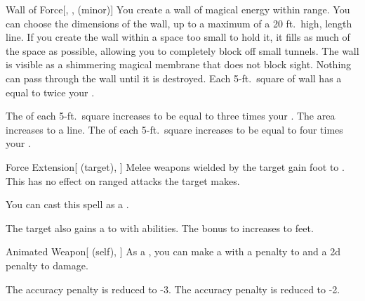 \lowercase{\hypertarget{spell:Wall of Force}{}}\label{spell:Wall of Force}
\begin{freeability}[Rank 1]{\hypertarget{spell:Wall of Force}{Wall of Force}}[, ,  (minor)]
\targetrule
You create a wall of magical energy within \rngmed range.
You can choose the dimensions of the wall, up to a maximum of a 20 ft.\ high, \areamed length line.
If you create the wall within a space too small to hold it, it fills as much of the space as possible, allowing you to completely block off small tunnels.
The wall is visible as a shimmering magical membrane that does not block sight.
Nothing can pass through the wall until it is destroyed.
Each 5-ft.\ square of wall has a  equal to twice your .

\rankline
{} The  of each 5-ft.\ square increases to be equal to three times your .
 The area increases to a \arealarge line.
 The  of each 5-ft.\ square increases to be equal to four times your .
\end{freeability}
\vspace{0.25em}



\lowercase{\hypertarget{spell:Force Extension}{}}\label{spell:Force Extension}
\begin{attuneability}[Rank 3]{\hypertarget{spell:Force Extension}{Force Extension}}[ (target), ]
Melee weapons wielded by the target gain  foot  to .
This has no effect on ranged attacks the target makes.

You can cast this spell as a .

\rankline
{} The target also gains a   to  with  abilities.
 The bonus to  increases to  feet.
\end{attuneability}
\vspace{0.25em}



\lowercase{\hypertarget{spell:Animated Weapon}{}}\label{spell:Animated Weapon}
\begin{attuneability}[Rank 4]{\hypertarget{spell:Animated Weapon}{Animated Weapon}}[ (self), ]
As a , you can make a  with a  penalty to  and a \minus2d penalty to damage.

\rankline
{} The accuracy penalty is reduced to -3.
 The accuracy penalty is reduced to -2.
\end{attuneability}
\vspace{0.25em}




